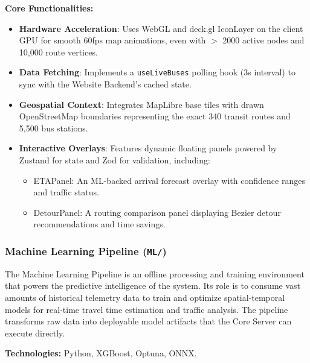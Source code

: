 \documentclass[a4paper]{article}
\begin{document}
\textbf{Core Functionalities:}
\begin{itemize}
    \item \textbf{Hardware Acceleration}: Uses WebGL and deck.gl IconLayer on the client GPU for smooth 60fps map animations, even with $>$ 2000 active nodes and 10,000 route vertices.
    \item \textbf{Data Fetching}: Implements a \texttt{useLiveBuses} polling hook (3s interval) to sync with the Website Backend's cached state.
    \item \textbf{Geospatial Context}: Integrates MapLibre base tiles with drawn OpenStreetMap boundaries representing the exact 340 transit routes and 5,500 bus stations.
    \item \textbf{Interactive Overlays}: Features dynamic floating panels powered by Zustand for state and Zod for validation, including:
    \begin{itemize}
        \item ETAPanel: An ML-backed arrival forecast overlay with confidence ranges and traffic status.
        \item DetourPanel: A routing comparison panel displaying Bezier detour recommendations and time savings.
    \end{itemize}
\end{itemize}

\subsubsection{Machine Learning Pipeline (\texttt{ML/})}
The Machine Learning Pipeline is an offline processing and training environment that powers the predictive intelligence of the system. Its role is to consume vast amounts of historical telemetry data to train and optimize spatial-temporal models for real-time travel time estimation and traffic analysis. The pipeline transforms raw data into deployable model artifacts that the Core Server can execute directly.

\textbf{Technologies:} Python, XGBoost, Optuna, ONNX.
\medskip
\end{document}
